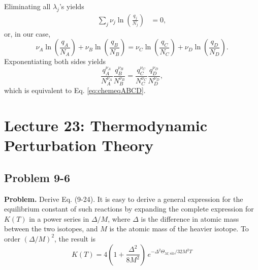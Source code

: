 \documentclass[twocolumn, 10pt]{article}
\numberwithin{equation}{section}
\newenvironment{problem}
{\par\medskip \color{problue}
  \textbf{Problem. }\ignorespaces}
{\medskip}
\newenvironment{solution}[1][\empty]
{\par\medskip\sffamily
  \textbf{\ifx\empty#1{Solution.}\relax\else{#1}\fi} \ignorespaces}
{\medskip}
\begin{document}
\begin{solution}
  Eliminating all $\lambda_j$'s yields
  \begin{align*}
    \sum_j \nu_j \ln\left( \frac{q_j}{N_j} \right)
    &=
    0
    ,
  \end{align*}
  or, in our case,
  $$
    \nu_A \ln\left( \frac{q_A}{N_A} \right) +
    \nu_B \ln\left( \frac{q_B}{N_B} \right)
    =
    \nu_C \ln\left( \frac{q_C}{N_C} \right) +
    \nu_D \ln\left( \frac{q_D}{N_D} \right)
    .
  $$
  Exponentiating both sides yields
  $$
    \frac{q_A^{\nu_A}}{N_A^{\nu_A}}
    \frac{q_B^{\nu_B}}{N_B^{\nu_B}}
    =
    \frac{q_C^{\nu_C}}{N_C^{\nu_C}}
    \frac{q_D^{\nu_D}}{N_D^{\nu_D}}
    ,
  $$
  which is equivalent to Eq. \eqref{eq:chemeqABCD}.
\end{solution}

\section{Lecture 23: Thermodynamic Perturbation Theory}

\subsection{Problem 9-6}

\begin{problem}
Derive Eq. (9-24).
It is easy to derive a general expression
for the equilibrium constant of such reactions
by expanding the complete expression for $K(T)$
in a power series in $\Delta/M$,
where $\Delta$ is the difference
in atomic mass between the two isotopes,
and $M$ is the atomic mass of the heavier isotope.
To order $(\Delta/M)^2$, the result is
\begin{equation}
  K(T)
  =
  4\left( 1 + \frac{\Delta^2}{8M^2} \right)
  \, e^{-\Delta^2 \Theta_{M,\mathrm{vib}}/32M^2T}
  \tag{9-24}
  \label{eq:K_iso_MDelta}
\end{equation}
\end{problem}
\end{document}
